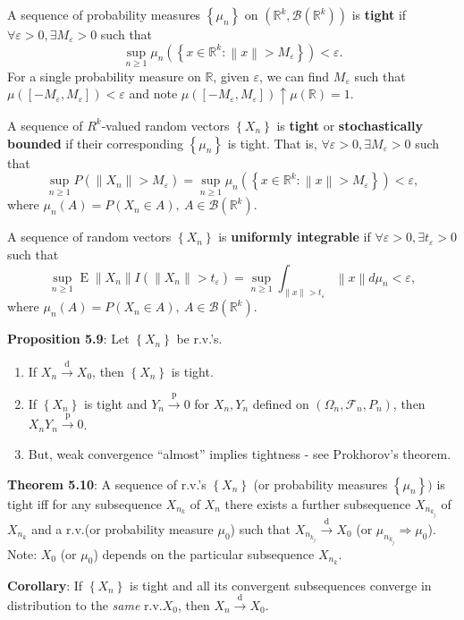 \documentclass[paper=letter,fontsize=3mm]{scrartcl}
\DeclareMathOperator{\E}{E}
\newcommand{\convdist}{\stackrel{\text{d}}{\longrightarrow}}
\newcommand{\convprob}{\stackrel{\text{p}}{\longrightarrow}}
\newcommand{\Borel}{\mathcal{B}}
\newcommand{\eps}{\varepsilon}
\newcommand{\R}{\mathbb{R}}
\newcommand\norm[1]{\left\lVert #1 \right\rVert}
\newcommand\set[1]{\left\{ #1 \right\}}
\begin{document}
\begin{multicols*}{3}
A sequence of probability measures $\set{\mu_n}$ on $(\R^k, \Borel(\R^k))$ is \textbf{tight} if $\forall \eps >0, \exists M_\eps > 0 $ such that
$$\sup_{n\ge1} \mu_n\left(\set{x\in\R^k: \norm{x} > M_\eps}\right) < \eps.$$
For a single probability measure on $\R$, given $\eps$, we can find $M_\eps$ such that $\mu([-M_\eps, M_\eps]) < \eps$ and note $\mu([-M_\eps, M_\eps]) \uparrow \mu(\R) = 1$. \\ \medskip

A sequence of $R^k$-valued random vectors $\set{X_n}$ is \textbf{tight} or \textbf{stochastically bounded} if their corresponding $\set{\mu_n}$ is tight. That is, $\forall \eps > 0, \exists M_\eps > 0$ such that
$$\sup_{n\ge1}P(\norm{X_n} > M_\eps) = \sup_{n\ge1}\mu_n\left(\set{x \in \R^k: \norm{x} > M_\eps }\right) < \eps,$$
where $\mu_n(A) = P(X_n \in A), ~ A \in \Borel(\R^k)$. \\ \medskip

A sequence of random vectors $\set{X_n}$ is \textbf{uniformly integrable} if $\forall \eps > 0, \exists t_\eps > 0$ such that
$$\sup_{n\ge1}\E \norm{X_n} I(\norm{X_n} > t_\eps) = \sup_{n\ge1}\int_{\norm{x} > t_\eps} \norm{x} d\mu_n < \eps,$$
where $\mu_n(A) = P(X_n \in A), ~ A \in \Borel(\R^k)$. \\ \medskip

\textbf{Proposition 5.9}: Let $\set{X_n}$ be r.v.'s.
\begin{enumerate}
\item If $X_n \convdist X_0$, then $\set{X_n}$ is tight. 
\item If $\set{X_n}$ is tight and $Y_n \convprob 0$ for $X_n, Y_n$ defined on $(\Omega_n, \mathcal{F}_n, P_n)$, then $X_nY_n \convprob 0$.
\item But, weak convergence ``almost'' implies tightness - see Prokhorov's theorem.
\end{enumerate}

\textbf{Theorem 5.10}: A sequence of r.v.'s $\set{X_n}$ (or probability measures $\set{\mu_n})$ is tight iff for any subsequence $X_{n_k}$ of $X_n$ there exists a further subsequence $X_{n_{k_j}}$ of $X_{n_k}$ and a r.v.\@ (or probability measure $\mu_0$) such that $X_{n_{k_j}} \convdist X_0$ (or $\mu_{n_{k_j}} \Rightarrow \mu_0$). Note: $X_0$ (or $\mu_0$) depends on the particular subsequence $X_{n_k}$.  \\ \medskip

\textbf{Corollary}: If $\set{X_n}$ is tight and all its convergent subsequences converge in distribution to the \emph{same} r.v.\@ $X_0$, then $X_n \convdist X_0$.  \\ \medskip


\end{multicols*}
\end{document}
